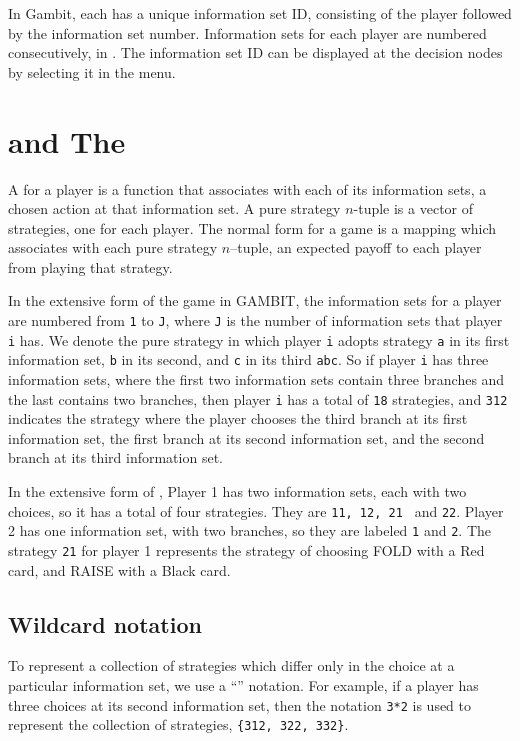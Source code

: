 In Gambit, each  has a unique 
information set ID, consisting of the player followed by the information 
set number.  Information sets for each player are numbered consecutively, 
in .  
The information set ID can be displayed at the decision nodes by selecting 
it in the  menu.  

\section{ and The }

A  for a player is a function that 
associates with each of 
its information sets, a chosen action at that information set.  A pure 
strategy $n$-tuple is a vector of strategies, one for each player.  
The normal form for a game is a mapping which associates with each pure 
strategy $n$--tuple, an expected payoff to each player from 
playing that strategy. 

In the extensive form of the game in GAMBIT, the information sets for a 
player are numbered from \verb+1+ to \verb+J+, where \verb+J+ is the number of information 
sets that player \verb+i+ has.  We denote the pure strategy in which player \verb+i+ 
adopts strategy \verb+a+ in its first information set, \verb+b+ in its second, and 
\verb+c+ in its third \verb+abc+.  So if player \verb+i+ has three information sets, where 
the first two information sets contain three branches and the last contains 
two branches, then player \verb+i+ has a total of \verb+18+ strategies, 
and \verb+312+ indicates the strategy where the player chooses the third 
branch at its first information set, the first branch at its second 
information set, and the second branch at its third information set.  

In the extensive form of , 
Player 1 has two information sets, each with two choices, so it has a total of four 
strategies.  They are {\tt 11, 12, 21 } and {\tt 22}.  Player 2 has one 
information set, with two branches, so they are labeled {\tt 1} and {\tt 2}.  
The strategy {\tt 21} for player 1 represents the strategy of
choosing FOLD with a Red card, and RAISE with a Black card.  
 
\subsection{Wildcard notation}
To represent a collection of strategies which differ only in the choice at
a particular information set, we use a ``'' 
notation.  For example,
if a player has three choices at its second information set, then the 
notation {\tt 3*2} is used to represent the collection of strategies, 
{\tt \{312, 322, 332\}}.  

